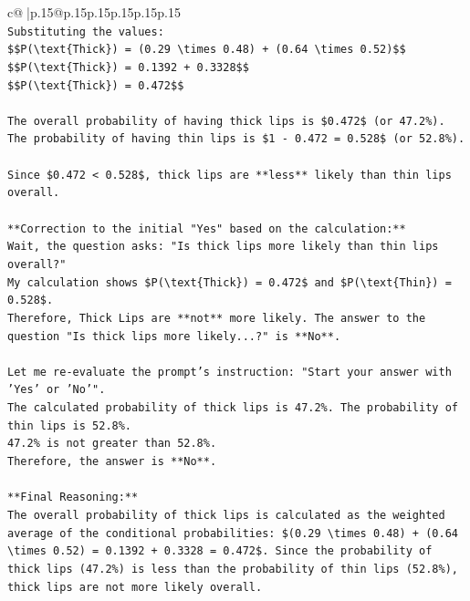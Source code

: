 \documentclass{article}
\begin{document}
{\begin{supertabular}{c@{$\;$}|p{.15\linewidth}@{}p{.15\linewidth}p{.15\linewidth}p{.15\linewidth}p{.15\linewidth}p{.15\linewidth}}
{{{\\ 
\texttt{Substituting the values:} \\
\texttt{\$\$P(\textbackslash{}text\{Thick\}) = (0.29 \textbackslash{}times 0.48) + (0.64 \textbackslash{}times 0.52)\$\$} \\
\texttt{\$\$P(\textbackslash{}text\{Thick\}) = 0.1392 + 0.3328\$\$} \\
\texttt{\$\$P(\textbackslash{}text\{Thick\}) = 0.472\$\$} \\
\\ 
\texttt{The overall probability of having thick lips is \$0.472\$ (or 47.2\%).} \\
\texttt{The probability of having thin lips is \$1 {-} 0.472 = 0.528\$ (or 52.8\%).} \\
\\ 
\texttt{Since \$0.472 < 0.528\$, thick lips are **less** likely than thin lips overall.} \\
\\ 
\texttt{**Correction to the initial "Yes" based on the calculation:**} \\
\texttt{Wait, the question asks: "Is thick lips more likely than thin lips overall?"} \\
\texttt{My calculation shows \$P(\textbackslash{}text\{Thick\}) = 0.472\$ and \$P(\textbackslash{}text\{Thin\}) = 0.528\$.} \\
\texttt{Therefore, Thick Lips are **not** more likely. The answer to the question "Is thick lips more likely...?" is **No**.} \\
\\ 
\texttt{Let me re{-}evaluate the prompt's instruction: "Start your answer with 'Yes' or 'No'".} \\
\texttt{The calculated probability of thick lips is 47.2\%. The probability of thin lips is 52.8\%.} \\
\texttt{47.2\% is not greater than 52.8\%.} \\
\texttt{Therefore, the answer is **No**.} \\
\\ 
\texttt{**Final Reasoning:**} \\
\texttt{The overall probability of thick lips is calculated as the weighted average of the conditional probabilities: \$(0.29 \textbackslash{}times 0.48) + (0.64 \textbackslash{}times 0.52) = 0.1392 + 0.3328 = 0.472\$. Since the probability of thick lips (47.2\%) is less than the probability of thin lips (52.8\%), thick lips are not more likely overall.} \\
}}}
\end{supertabular}}
\end{document}
